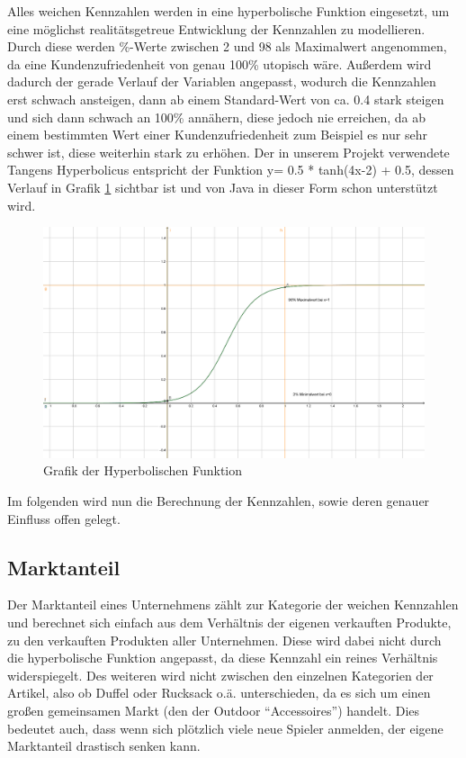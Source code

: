 Alles weichen Kennzahlen werden in eine hyperbolische Funktion eingesetzt, um eine möglichst realitätsgetreue Entwicklung der Kennzahlen zu modellieren. Durch diese werden \%-Werte zwischen 2 und 98 als Maximalwert angenommen, da eine Kundenzufriedenheit von genau 100\% utopisch wäre. Außerdem wird dadurch der gerade Verlauf der Variablen angepasst, wodurch die Kennzahlen erst schwach ansteigen, dann ab einem Standard-Wert von ca. 0.4 stark steigen und sich dann schwach an 100\% annähern, diese jedoch nie erreichen, da ab einem bestimmten Wert einer Kundenzufriedenheit zum Beispiel es nur sehr schwer ist, diese weiterhin stark zu erhöhen. Der in unserem Projekt verwendete Tangens Hyperbolicus entspricht der Funktion y= 0.5 * tanh(4x-2) + 0.5, dessen Verlauf in Grafik \ref{hyperbolic_function} sichtbar ist und von Java in dieser Form schon unterstützt wird.
\begin{figure}
	\centering
	\includegraphics{img/Funktion.png}
	\caption{Grafik der Hyperbolischen Funktion}
	\label{hyperbolic_function}
\end{figure}

Im folgenden wird nun die Berechnung der Kennzahlen, sowie deren genauer Einfluss offen gelegt.  

\subsection{Marktanteil} 
Der Marktanteil eines Unternehmens zählt zur Kategorie der weichen Kennzahlen und berechnet sich einfach aus dem Verhältnis der eigenen verkauften Produkte, zu den verkauften Produkten aller Unternehmen. Diese wird dabei nicht durch die hyperbolische Funktion angepasst, da diese Kennzahl ein reines Verhältnis widerspiegelt. Des weiteren wird nicht zwischen den einzelnen Kategorien der Artikel, also ob Duffel oder Rucksack o.ä. unterschieden, da es sich um einen großen gemeinsamen Markt (den der Outdoor \enquote{Accessoires}) handelt. Dies bedeutet auch, dass wenn sich plötzlich viele neue Spieler anmelden, der eigene Marktanteil drastisch senken kann. 

